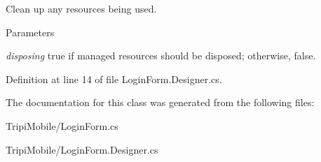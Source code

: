 Clean up any resources being used. 
\begin{DoxyParams}{Parameters}
\item[{\em disposing}]true if managed resources should be disposed; otherwise, false.\end{DoxyParams}


Definition at line 14 of file LoginForm.Designer.cs.

The documentation for this class was generated from the following files:\begin{DoxyCompactItemize}
\item 
TripiMobile/LoginForm.cs\item 
TripiMobile/LoginForm.Designer.cs\end{DoxyCompactItemize}
